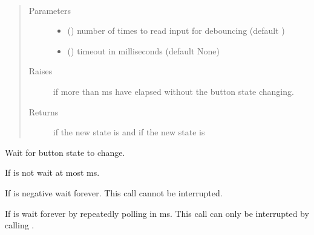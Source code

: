 \documentclass[letterpaper,10pt,english]{sphinxmanual}
\begin{document}
\begin{fulllineitems}
\begin{fulllineitems}
\end{fulllineitems}


\begin{fulllineitems}
\label{\detokenize{index:rcpy.button.Button.released}}~\begin{quote}\begin{description}
\item[{Parameters}] \leavevmode\begin{itemize}
\item {} 
 () \textendash{} number of times to read input for debouncing (default )

\item {} 
 () \textendash{} timeout in milliseconds (default None)

\end{itemize}

\item[{Raises}] \leavevmode
{\hyperref[\detokenize{index:rcpy.gpio.InputTimeout}]{}} \textendash{} if more than  ms have elapsed without the button state changing.

\item[{Returns}] \leavevmode
{} if the new state is {\hyperref[\detokenize{index:rcpy.button.RELEASED}]{}} and  if the new state is {\hyperref[\detokenize{index:rcpy.button.PRESSED}]{}}

\end{description}\end{quote}

Wait for button state to change.

If  is not  wait at most  ms.

If  is negative wait forever. This call cannot be interrupted.

If  is  wait forever by repeatedly polling in {\hyperref[\detokenize{index:rcpy.gpio.POLL_TIMEOUT}]{}} ms. This call can only be interrupted by calling {\hyperref[\detokenize{index:rcpy.exit}]{}}.

\end{fulllineitems}


\end{fulllineitems}
\end{document}
